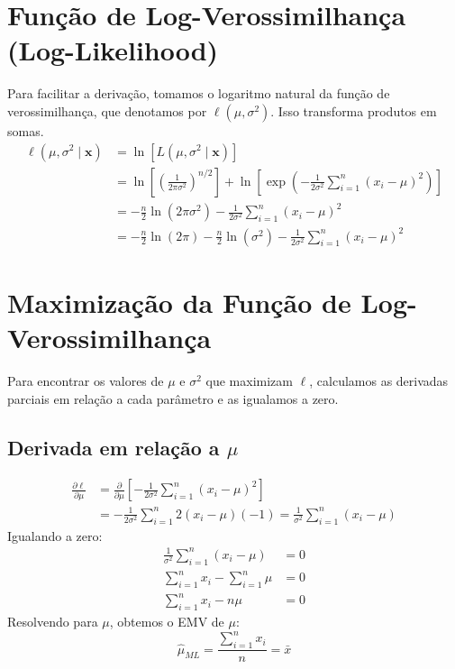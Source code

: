 \section{Função de Log-Verossimilhança (Log-Likelihood)}
Para facilitar a derivação, tomamos o logaritmo natural da função de verossimilhança, que denotamos por $\ell(\mu, \sigma^2)$. Isso transforma produtos em somas.
\begin{align*}
    \ell(\mu, \sigma^2 \mid \mathbf{x}) &= \ln\left[ L(\mu, \sigma^2 \mid \mathbf{x}) \right] \\
    &= \ln\left[ \left( \frac{1}{2\pi\sigma^2} \right)^{n/2} \right] + \ln\left[ \exp\left( -\frac{1}{2\sigma^2} \sum_{i=1}^{n} (x_i-\mu)^2 \right) \right] \\
    &= -\frac{n}{2} \ln(2\pi\sigma^2) - \frac{1}{2\sigma^2} \sum_{i=1}^{n} (x_i-\mu)^2 \\
    &= -\frac{n}{2} \ln(2\pi) - \frac{n}{2} \ln(\sigma^2) - \frac{1}{2\sigma^2} \sum_{i=1}^{n} (x_i-\mu)^2
\end{align*}

\section{Maximização da Função de Log-Verossimilhança}
Para encontrar os valores de $\mu$ e $\sigma^2$ que maximizam $\ell$, calculamos as derivadas parciais em relação a cada parâmetro e as igualamos a zero.

\subsection{Derivada em relação a \(\mu\)}
\begin{align*}
    \frac{\partial \ell}{\partial \mu} &= \frac{\partial}{\partial \mu} \left[ -\frac{1}{2\sigma^2} \sum_{i=1}^{n} (x_i-\mu)^2 \right] \\
    &= -\frac{1}{2\sigma^2} \sum_{i=1}^{n} 2(x_i-\mu)(-1) = \frac{1}{\sigma^2} \sum_{i=1}^{n} (x_i-\mu)
\end{align*}
Igualando a zero:
\begin{align*}
    \frac{1}{\sigma^2} \sum_{i=1}^{n} (x_i-\mu) &= 0 \\
    \sum_{i=1}^{n} x_i - \sum_{i=1}^{n} \mu &= 0 \\
    \sum_{i=1}^{n} x_i - n\mu &= 0
\end{align*}
Resolvendo para $\mu$, obtemos o EMV de $\mu$:
\[
\hat{\mu}_{ML} = \frac{\sum_{i=1}^{n} x_i}{n} = \bar{x}
\]

